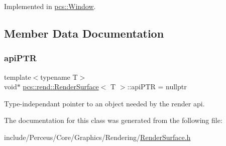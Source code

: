 Implemented in \hyperlink{classpcs_1_1Window_a4d103be3712fbb051d7c4d446a266de0}{pcs\+::\+Window}.



\subsection{Member Data Documentation}
\mbox{\label{classpcs_1_1rend_1_1RenderSurface_ac991c5aaed973108fa4bb97d605f02cc}} 
\subsubsection{\texorpdfstring{api\+P\+TR}{apiPTR}}
{\footnotesize\ttfamily template$<$typename T$>$ \\
void$\ast$ \hyperlink{classpcs_1_1rend_1_1RenderSurface}{pcs\+::rend\+::\+Render\+Surface}$<$ T $>$\+::api\+P\+TR = nullptr\hspace{0.3cm}{\ttfamily [protected]}}



Type-\/independant pointer to an object needed by the render api. 



The documentation for this class was generated from the following file\+:\begin{DoxyCompactItemize}
\item 
include/\+Perceus/\+Core/\+Graphics/\+Rendering/\hyperlink{RenderSurface_8h}{Render\+Surface.\+h}\end{DoxyCompactItemize}
